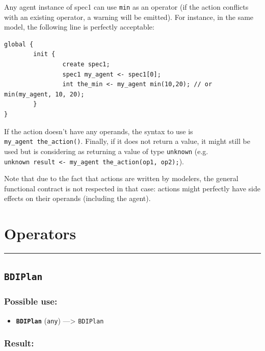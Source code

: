 \documentclass[]{book}
\providecommand{\tightlist}{%
  \setlength{\itemsep}{0pt}\setlength{\parskip}{0pt}}
\theoremstyle{definition}
\theoremstyle{definition}
\theoremstyle{definition}
\theoremstyle{remark}
\begin{document}
Any agent instance of spec1 can use \texttt{min} as an operator (if the
action conflicts with an existing operator, a warning will be emitted).
For instance, in the same model, the following line is perfectly
acceptable:

\begin{verbatim}
global {
        init {
                create spec1;
                spec1 my_agent <- spec1[0];
                int the_min <- my_agent min(10,20); // or min(my_agent, 10, 20);
        }
}
\end{verbatim}

If the action doesn't have any operands, the syntax to use is
\texttt{my\_agent\ the\_action()}. Finally, if it does not return a
value, it might still be used but is considering as returning a value of
type \texttt{unknown} (e.g.
\texttt{unknown\ result\ \textless{}-\ my\_agent\ the\_action(op1,\ op2);}).

Note that due to the fact that actions are written by modelers, the
general functional contract is not respected in that case: actions might
perfectly have side effects on their operands (including the agent).

\section{Operators}\label{operators-1}

\begin{center}\rule{0.5\linewidth}{\linethickness}\end{center}

\subsection{\texorpdfstring{\texttt{BDIPlan}}{BDIPlan}}\label{bdiplan}

\subsubsection{Possible use:}\label{possible-use-63}

\begin{itemize}
\tightlist
\item
  \textbf{\texttt{BDIPlan}} (\texttt{any}) ---\textgreater{}
  \texttt{BDIPlan}
\end{itemize}

\subsubsection{Result:}\label{result-62}
\end{document}
